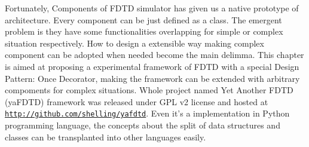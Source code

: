 Fortunately, Components of FDTD simulator has given us a native prototype of architecture. Every component can be just
defined as a class. The emergent problem is they have some functionalities overlapping for simple or complex situation
respectively. How to design a extensible way making complex component can be adopted when needed become the main
delimma. This chapter is aimed at proposing a experimental framework of FDTD with a special Design Pattern: Once
Decorator, making the framework can be extended with arbitrary compoments for complex situations. Whole project named
Yet Another FDTD (yaFDTD) framework was released under GPL v2 license and hosted at
\texttt{\url{http://github.com/shelling/yafdtd}}. Even it's a implementation in Python programming language, the
concepts about the split of data structures and classes can be transplanted into other languages easily.
